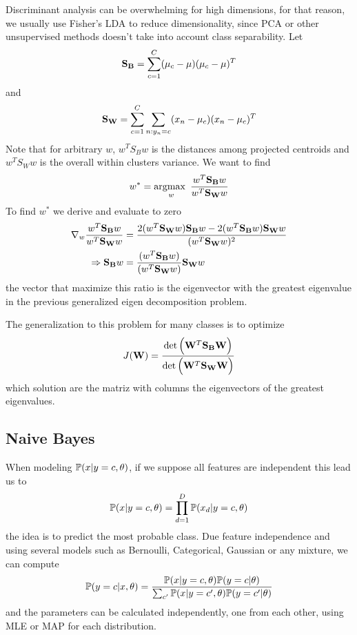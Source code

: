 \documentclass[../../main.tex]{subfiles}
\begin{document}
Discriminant analysis can be overwhelming for high dimensions, for that reason, we usually use Fisher's LDA to reduce dimensionality, since PCA or other unsupervised methods doesn't take into account class separability. Let
\begin{equation*}
    \mathbf{S_B} = \sum_{c=1}^C (\mu_c - \mu)(\mu_c - \mu)^T
\end{equation*}
and
\begin{equation*}
    \mathbf{S_W} = \sum_{c=1}^C \sum_{n:y_n=c} (x_n - \mu_c)(x_n - \mu_c)^T
\end{equation*}
Note that for arbitrary $w$, $w^T S_B w$ is the distances among projected centroids and $w^T S_W w$ is the overall within clusters variance. We want to find 
\begin{equation*}
    w^* = \operatorname*{argmax\text{ }}_w\dfrac{w^T \mathbf{S_B} w}{w^T \mathbf{S_W} w}
\end{equation*}
To find $w^*$ we derive and evaluate to zero
\begin{align*}
    \nabla_w \dfrac{w^T \mathbf{S_B} w}{w^T \mathbf{S_W} w}
    &= \dfrac{2(w^T \mathbf{S_W} w)\mathbf{S_B} w -2(w^T \mathbf{S_B} w) \mathbf{S_W} w}{(w^T \mathbf{S_W} w)^2}\\
    \Rightarrow \mathbf{S_B} w 
    &= \dfrac{(w^T \mathbf{S_B} w)}{(w^T \mathbf{S_W} w)} \mathbf{S_W} w
\end{align*}
the vector that maximize this ratio is the eigenvector with the greatest eigenvalue in the previous generalized eigen decomposition problem.

The generalization to this problem for many classes is to optimize
\begin{equation*}
    J(\mathbf{W}) = \dfrac{\det\Big( \mathbf{W}^T \mathbf{S_B} \mathbf{W} \Big)}{\det\Big( \mathbf{W}^T \mathbf{S_W} \mathbf{W} \Big)}
\end{equation*}
which solution are the matriz with columns the eigenvectors of the greatest eigenvalues.

\subsection{Naive Bayes}
When modeling $\mathbb{P}(x|y=c,\theta)$, if we suppose all features are independent this lead us to 
\begin{equation*}
    \mathbb{P}(x|y=c,\theta) = \prod_{d=1}^D \mathbb{P}(x_d|y=c,\theta)
\end{equation*}
the idea is to predict the most probable class. Due feature independence and using several models such as Bernoulli, Categorical, Gaussian or any mixture, we can compute 
\begin{equation*}
    \mathbb{P}(y=c|x,\theta) = \dfrac{\mathbb{P}(x|y=c,\theta)\mathbb{P}(y=c|\theta)}{\sum_{c'}\mathbb{P}(x|y=c',\theta)\mathbb{P}(y=c'|\theta)}
\end{equation*}
and the parameters can be calculated independently, one from each other, using MLE or MAP for each distribution.    
\end{document}
